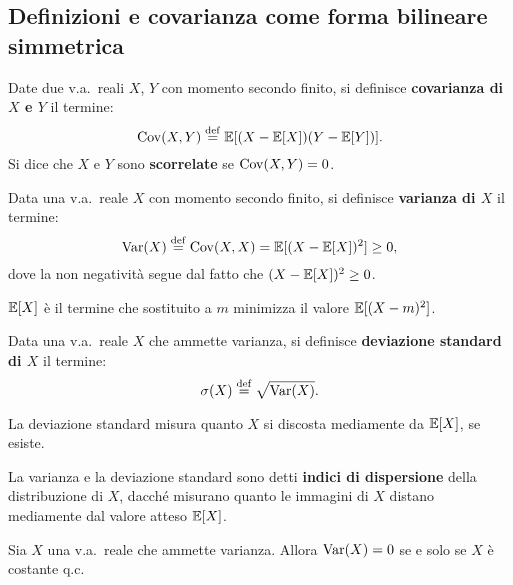 \begin{multicols*}{2}
\subsection{Definizioni e covarianza come forma bilineare simmetrica}

\begin{definition}
    Date due v.a.~reali $X$, $Y$ con momento secondo finito,
    si definisce \textbf{covarianza di $X$ e $Y$} il termine:
    \[
        \operatorname{Cov}(X, Y) \overset{\mathrm{def}}{=} \mathbb{E}[(X - \mathbb{E}[X])(Y - \mathbb{E}[Y])].
    \]
    Si dice che $X$ e $Y$ sono \textbf{scorrelate} se $\operatorname{Cov}(X, Y) = 0$.
\end{definition}

\begin{definition}[Varianza]
    Data una v.a.~reale $X$ con momento secondo finito, si
    definisce \textbf{varianza di $X$} il termine:
    \[
        \operatorname{Var}(X) \overset{\mathrm{def}}{=} \operatorname{Cov}(X, X) = \mathbb{E}[(X -\mathbb{E}[X])^2] \geq 0,
    \]
    dove la non negatività segue dal fatto che $(X - \mathbb{E}[X])^2 \geq 0$.
\end{definition}

\begin{proposition}
    $\mathbb{E}[X]$ è il termine che sostituito a $m$ minimizza il valore $\mathbb{E}[(X - m)^2]$.
\end{proposition}

\begin{definition}
    Data una v.a.~reale $X$ che ammette varianza, si definisce
    \textbf{deviazione standard di $X$} il termine:
    \[
        \sigma(X) \overset{\mathrm{def}}{=} \sqrt{\operatorname{Var}(X)}.
    \]
\end{definition}

\begin{remark}
    La deviazione standard misura quanto $X$ si discosta mediamente da
    $\mathbb{E}[X]$, se esiste.
\end{remark}

\begin{remark}
    La varianza e la deviazione standard sono
    detti \textbf{indici di dispersione} della distribuzione
    di $X$, dacché misurano
    quanto le immagini di $X$ distano mediamente dal valore
    atteso $\mathbb{E}[X]$.
\end{remark}

\begin{proposition}
    \label{prop:cono_isotropo}
    Sia $X$ una v.a.~reale che ammette varianza. Allora
    $\operatorname{Var}(X) = 0$ se e solo se $X$ è costante q.c. \smallskip



\end{proposition}
\end{multicols*}
